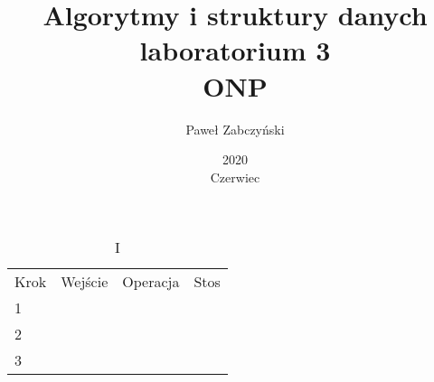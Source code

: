 \documentclass{article}
\title{Algorytmy i struktury danych laboratorium 3\\ONP}
\author{Paweł Zabczyński}
\date{2020\\ Czerwiec}
\begin{document}
\maketitle

\begin{table}[]
\caption{I}
\begin{tabular}{llll}
Krok & Wejście & Operacja & Stos \\
    1 &         &          &      \\
    2 &         &          &      \\
    3 &         &          &     
\end{tabular}
\end{table}
\end{document}
